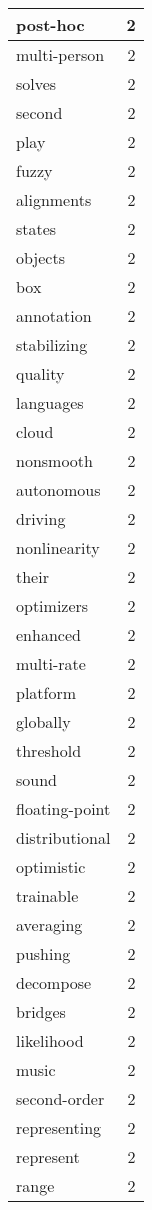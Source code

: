 \begin{table}[h]
\begin{tabular}{|l|r|}
\hline
post-hoc & 2 \\
\hline
multi-person & 2 \\
\hline
solves & 2 \\
\hline
second & 2 \\
\hline
play & 2 \\
\hline
fuzzy & 2 \\
\hline
alignments & 2 \\
\hline
states & 2 \\
\hline
objects & 2 \\
\hline
box & 2 \\
\hline
annotation & 2 \\
\hline
stabilizing & 2 \\
\hline
quality & 2 \\
\hline
languages & 2 \\
\hline
cloud & 2 \\
\hline
nonsmooth & 2 \\
\hline
autonomous & 2 \\
\hline
driving & 2 \\
\hline
nonlinearity & 2 \\
\hline
their & 2 \\
\hline
optimizers & 2 \\
\hline
enhanced & 2 \\
\hline
multi-rate & 2 \\
\hline
platform & 2 \\
\hline
globally & 2 \\
\hline
threshold & 2 \\
\hline
sound & 2 \\
\hline
floating-point & 2 \\
\hline
distributional & 2 \\
\hline
optimistic & 2 \\
\hline
trainable & 2 \\
\hline
averaging & 2 \\
\hline
pushing & 2 \\
\hline
decompose & 2 \\
\hline
bridges & 2 \\
\hline
likelihood & 2 \\
\hline
music & 2 \\
\hline
second-order & 2 \\
\hline
representing & 2 \\
\hline
represent & 2 \\
\hline
range & 2 \\
\hline

\end{tabular}
\end{table}
